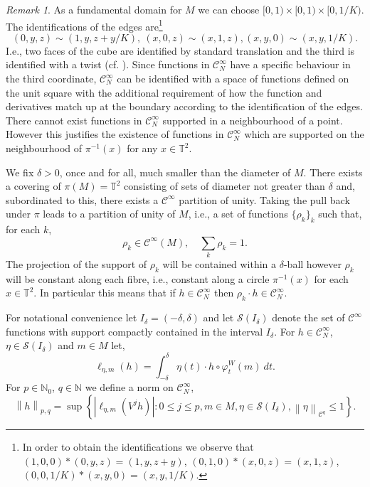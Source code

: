 \documentclass[a4paper,11pt]{amsart}
\theoremstyle{remark}
\newtheorem{remark}[theorem]{Remark}
\newcommand{\abs}[1]{\left|#1\right|} %
\newcommand{\cC}{\mathcal{C}} %
\newcommand{\cS}{\mathcal{S}} %
\newcommand{\bN}{\mathbb{N}} %
\newcommand{\bT}{\mathbb{T}} %
\newcommand{\norm}[1]{\left\|#1\right\|} %
\newcommand{\dv}{V} %
\newcommand{\dw}{W} %
\begin{document}
\begin{remark}
    \label{rem:projection}
    As a fundamental domain for \(M\) we can choose \([0,1) \times [0,1) \times [0,1/K)\).
    The identifications of the edges are\footnote{In order to obtain the identifications we observe that \((1,0,0) * (0,y,z) = (1,y,z+y)\), \((0,1,0) * (x,0,z) = (x,1,z)\), \((0,0,1/K) * (x,y,0) = (x,y,1/K)\).}  
    \[
        (0,y,z) \sim (1,y,z+y/K ),\ (x,0,z) \sim (x,1,z), (x,y,0) \sim (x,y,1/K).
    \]
    I.e., two faces of the cube are identified by standard translation and the third is identified with a twist (cf. \cite{Shi14b}).
    Since functions in \(\cC^\infty_N\) have a specific behaviour in the third coordinate, \(\cC^\infty_N\) can be identified with a space of functions defined on the unit square with the additional requirement of how the function and derivatives match up at the boundary according to the identification of the edges.
    There cannot exist functions in \(\cC^\infty_N\) supported in a neighbourhood of a point.
    However this justifies the existence of functions in \(\cC^\infty_N\) which are supported on the neighbourhood of \(\pi^{-1} (x)\) for any \(x \in \mathbb{T}^2\).%
\end{remark}

We fix \(\delta > 0\), once and for all, much smaller than the diameter of \(M\).  
There exists a covering of \(\pi (M) = \bT^2\) consisting of sets of diameter not greater than \(\delta\) and, subordinated to this, there exists a \(\cC^\infty\) partition of unity.
Taking the pull back under \(\pi\) leads to a partition of unity of \(M\), i.e., a set of functions \(\{\rho_k\}_k\) such that, for each \(k\),
\begin{equation}
    \label{eq:part-unity}
    \rho_k \in \cC^\infty(M), \quad \sum_{k} \rho_k = 1.   
\end{equation}
The projection of the support of \(\rho_k\) will be contained within a \(\delta\)-ball however \(\rho_k\) will be constant along each fibre, i.e., constant along a circle \(\pi^{-1}(x)\) for each \(x \in \bT^2\).
In particular this means that if \(h \in \cC^\infty_N\) then \(\rho_k \cdot h \in \cC^\infty_N\).

For notational convenience let \(I_\delta = (-\delta,\delta)\) and let \(\cS(I_{\delta})\) denote the set of \(\cC^\infty\) functions with support compactly contained in the interval \(I_{\delta}\).
For \(h\in \cC_N^\infty\), \(\eta \in \cS(I_{\delta})\) and \(m\in M\) let,
\begin{equation}
    \label{eq:def-eta}
    \ell_{\eta,m}(h)
    = \int_{-\delta}^{\delta} \eta(t) \cdot h\circ \varphi_{t}^{\dw}(m) \ dt.
\end{equation}
For \(p\in\bN_0\), \(q\in\bN\) we define a norm on \(\cC_N^{\infty}\),
\[
    \norm{h}_{p,q}= \sup
    \left\{ \abs{\ell_{\eta,m}(\dv^j h)} : 0 \leq j\leq p, m\in M, \eta \in \cS(I_{\delta}),  \norm{\eta}_{\cC^{q}}\leq 1\right\}.
\]
\end{document}
